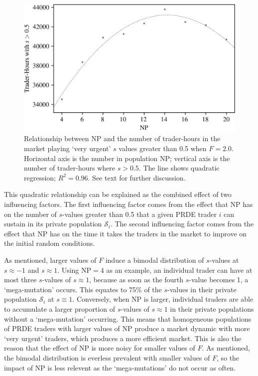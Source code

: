 \documentclass[conference]{IEEEtran}
\begin{document}
\begin{figure}[htbp]
    \centerline{\includegraphics[width=\columnwidth]{f=2.0_strats.png}}
    \caption{
        Relationship between $\mathrm{NP}$ and the number of trader-hours in the market playing `very urgent' $s$ values greater than 0.5 when $F=2.0$.
        Horizontal axis is the number in population $\mathrm{NP}$; vertical axis is the number of trader-hours where $s>0.5$.
        The line shows quadratic regression; $R^2=0.96$.
        See text for further discussion.
    }
    \label{F=2.0_strats}
\end{figure}

This quadratic relationship can be explained as the combined effect of two influencing factors.
The first influencing factor comes from the effect that $\mathrm{NP}$ has on the number of $s$-values greater than 0.5 that a given PRDE trader $i$ can sustain in its private population $\mathcal{S}_i$.
The second influencing factor comes from the effect that $\mathrm{NP}$ has on the time it takes the traders in the market to improve on the initial random conditions.

As mentioned, larger values of $F$ induce a bimodal distribution of $s$-values at $s\approx -1$ and $s\approx 1$.
Using $\mathrm{NP}=\mathrm{4}$ as an example, an individual trader can have at most three $s$-values of $s\approx 1$, because as soon as the fourth $s$-value becomes 1, a `mega-mutation' occurs.
This equates to 75\% of the $s$-values in their private population $\mathcal{S}_i$ at $s\equiv 1$.
Conversely, when $\mathrm{NP}$ is larger, individual traders are able to accumulate a larger proportion of $s$-values of $s\approx 1$ in their private populations without a `mega-mutation' occurring.
This means that homogeneous populations of PRDE traders with larger values of $\mathrm{NP}$ produce a market dynamic with more `very urgent' traders, which produces a more efficient market.
This is also the reason that the effect of $\mathrm{NP}$ is more noisy for smaller values of $F$.
As mentioned, the bimodal distribution is everless prevalent with smaller values of $F$, so the impact of $\mathrm{NP}$ is less relevent as the `mega-mutations' do not occur as often.
\end{document}
